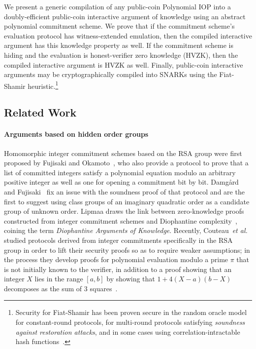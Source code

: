We present a generic compilation of any public-coin Polynomial IOP into a doubly-efficient public-coin interactive argument of knowledge using an abstract polynomial commitment scheme. We prove that if the commitment scheme's evaluation protocol has witness-extended emulation, then the compiled interactive argument has this knowledge property as well. If the commitment scheme is hiding and the evaluation is honest-verifier zero knowledge (HVZK), then the compiled interactive argument is HVZK as well. Finally, public-coin interactive arguments may be cryptographically compiled into SNARKs using the Fiat-Shamir heuristic.\footnote{Security for Fiat-Shamir has been proven secure in the random oracle model for constant-round protocols, for multi-round protocols satisfying \emph{soundness against restoration attacks}, and in some cases using correlation-intractable hash functions~\cite{C:FiaSha86,CCS:BelRog93,EC:PoiSte96,CSproofs,TCC:HalMyeRac08,TCC:BenChiSpo16,EC:AABN02,C:KalRotRot17,EC:CCRR18,FOCS:HolLom18,STOC:CCHLRRW19}.}

\subsection{Related Work}

\paragraph{Arguments based on hidden order groups} 
Homomorphic integer commitment schemes based on the RSA group were first proposed by Fujisaki and Okamoto~\cite{C:FujOka97}, who also provide a protocol to prove that a list of committed integers satisfy a polynomial equation modulo an arbitrary positive integer as well as one for opening a commitment bit by bit. Damgård and Fujisaki~\cite{AC:DamFuj02} fix an issue with the soundness proof of that protocol and are the first to suggest using class groups of an imaginary quadratic order as a candidate group of unknown order. Lipmaa draws the link between zero-knowledge proofs constructed from integer commitment schemes and Diophantine complexity~\cite{AC:Lipmaa03b}, coining the term \emph{Diophantine Arguments of Knowledge}. Recently, Couteau~\emph{et al.} studied protocols derived from integer commitments specifically in the RSA group in order to lift their security proofs so as to require weaker assumptions; in the process they develop proofs for polynomial evaluation modulo a prime $\pi$ that is not initially known to the verifier, in addition to a proof showing that an integer $X$ lies in the range $[a,b]$ by showing that $1+4(X-a)(b-X)$ decomposes as the sum of 3 squares~\cite{EC:CouPetPoi17}.

